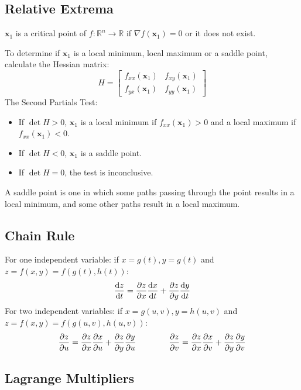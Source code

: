 \documentclass{article}
\begin{document}
\subsection{Relative Extrema}

$\mathbf x_1$ is a critical point of $f:\mathbb R^n\to\mathbb R$ if $\nabla f(\mathbf x_1)=0$ or it does not exist.

To determine if $\mathbf x_1$ is a local minimum, local maximum or a saddle point, calculate the Hessian matrix:
\begin{equation*}
    H=\begin{bmatrix}
		f_{xx}(\mathbf x_1) &
		f_{xy}(\mathbf x_1) \\
		f_{yx}(\mathbf x_1) &
		f_{yy}(\mathbf x_1)
    \end{bmatrix}
\end{equation*}
The Second Partials Test:
\begin{itemize}
	\item If $\det H>0$, $\mathbf x_1$ is a local minimum if $f_{xx}(\mathbf x_1)>0$ and a local maximum if $f_{xx}(\mathbf x_1)<0$.
	\item If $\det H<0$, $\mathbf x_1$ is a saddle point.
	\item If $\det H=0$, the test is inconclusive.
\end{itemize}
A saddle point is one in which some paths passing through the point results in a local minimum, and some other paths result in a local maximum.

\subsection{Chain Rule}

For one independent variable: if $x=g(t),y=g(t)$ and $z=f(x,y)=f(g(t),h(t))$:
\begin{equation*}
    \diff zt=\diffp zx\diff xt+\diffp zy\diff yt
\end{equation*}
For two independent variables: if $x=g(u,v),y=h(u,v)$ and $z=f(x,y)=f(g(u,v),h(u,v))$:
\begin{equation*}
    \diffp zu=\diffp zx\diffp xu+\diffp zy\diffp yu 
	\qquad\qquad
    \diffp zv=\diffp zx\diffp xv+\diffp zy\diffp yv
\end{equation*}

\subsection{Lagrange Multipliers}
\end{document}
